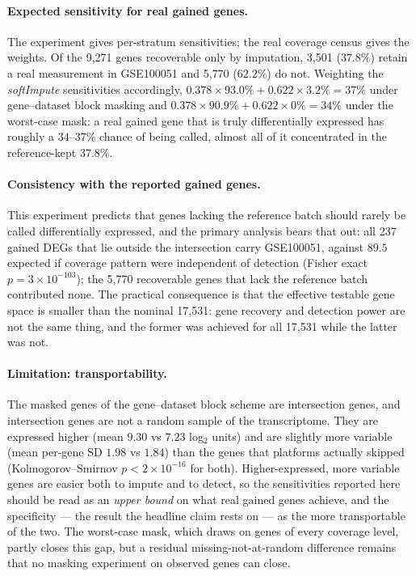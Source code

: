 \documentclass[11pt,a4paper]{article}
\begin{document}
\paragraph{Expected sensitivity for real gained genes.}
The experiment gives per-stratum sensitivities; the real
coverage census gives the weights. Of the 9{,}271 genes
recoverable only by imputation, 3{,}501 ($37.8\%$) retain a
real measurement in GSE100051 and 5{,}770 ($62.2\%$) do not.
Weighting the \textit{softImpute} sensitivities accordingly,
$0.378 \times 93.0\% + 0.622 \times 3.2\% = 37\%$ under
gene--dataset block masking and
$0.378 \times 90.9\% + 0.622 \times 0\% = 34\%$ under the
worst-case mask: a real gained gene that is truly
differentially expressed has roughly a $34$--$37\%$ chance of
being called, almost all of it concentrated in the
reference-kept $37.8\%$.

\paragraph{Consistency with the reported gained genes.}
This experiment predicts that genes lacking the reference batch
should rarely be called differentially expressed, and the
primary analysis bears that out: all 237 gained DEGs that lie
outside the intersection carry GSE100051, against $89.5$
expected if coverage pattern were independent of detection
(Fisher exact $p = 3\times10^{-103}$); the 5{,}770 recoverable
genes that lack the reference batch contributed none. The practical consequence is that
the effective testable gene space is smaller than the nominal
17{,}531: gene recovery and detection power are not the same
thing, and the former was achieved for all 17{,}531 while the
latter was not.

\paragraph{Limitation: transportability.}
The masked genes of the gene--dataset block scheme are
intersection genes, and intersection genes are not a random
sample of the transcriptome. They are expressed higher (mean
$9.30$ vs $7.23$ log$_2$ units) and are slightly more variable
(mean per-gene SD $1.98$ vs $1.84$) than the genes that
platforms actually skipped (Kolmogorov--Smirnov
$p < 2\times10^{-16}$ for both). Higher-expressed, more variable
genes are easier both to impute and to detect, so the
sensitivities reported here should be read as an
\emph{upper bound} on what real gained genes achieve, and the
specificity --- the result the headline claim rests on --- as
the more transportable of the two. The worst-case mask, which
draws on genes of every coverage level, partly closes this gap,
but a residual missing-not-at-random difference remains that no
masking experiment on observed genes can close.
\end{document}
